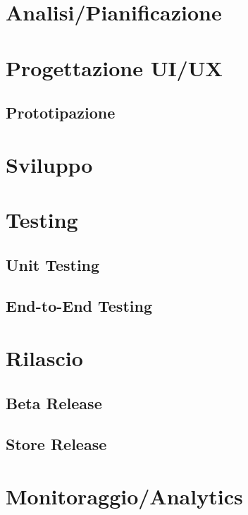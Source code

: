 


\section{Analisi/Pianificazione}

\section{Progettazione UI/UX}
\subsection{Prototipazione}

\section{Sviluppo}

\section{Testing}
\subsection{Unit Testing}
\subsection{End-to-End Testing}

\section{Rilascio}
\subsection{Beta Release}
\subsection{Store Release}

\section{Monitoraggio/Analytics}
